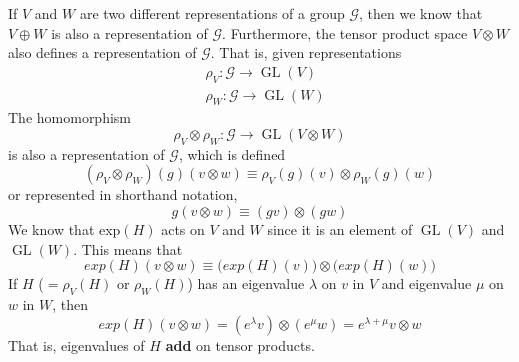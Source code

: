 \documentclass{article}
\DeclareMathOperator{\GL}{GL}
\begin{document}
      \begin{definition}
        If $V$ and $W$ are two different representations of a group $\mathcal{G}$, then we know that $V \oplus W$ is also a representation of $\mathcal{G}$. Furthermore, the tensor product space $V \otimes W$ also defines a representation of $\mathcal{G}$. That is, given representations
        \begin{align*}
          & \rho_V: \mathcal{G} \longrightarrow \GL(V) \\
          & \rho_W: \mathcal{G} \longrightarrow \GL(W)
        \end{align*}
        The homomorphism 
        \begin{equation}
          \rho_V \otimes \rho_W: \mathcal{G} \longrightarrow \GL(V \otimes W)
        \end{equation}
        is also a representation of $\mathcal{G}$, which is defined
        \begin{equation}
          (\rho_V \otimes \rho_W)(g) (v \otimes w) \equiv \rho_V (g) (v) \otimes \rho_W (g) (w)
        \end{equation}
        or represented in shorthand notation, 
        \begin{equation}
          g(v \otimes w) \equiv (g v) \otimes (g w)
        \end{equation}
        We know that exp$(H)$ acts on $V$ and $W$ since it is an element of $\GL(V)$ and $\GL(W)$. This means that
        \begin{equation}
          exp(H)(v \otimes w) \equiv \big( exp(H)(v)\big) \otimes \big( exp(H)(w)\big)
        \end{equation}
        If $H$ ($= \rho_V (H)$ or $\rho_W(H)$) has an eigenvalue $\lambda$ on $v$ in $V$ and eigenvalue $\mu$ on $w$ in $W$, then 
        \begin{equation}
          exp(H) (v \otimes w) = (e^\lambda v) \otimes (e^\mu w) = e^{\lambda + \mu} v \otimes w
        \end{equation}
        That is, eigenvalues of $H$ \textbf{add} on tensor products. 
      \end{definition}
\end{document}
